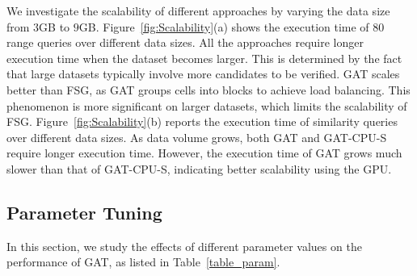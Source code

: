 \documentclass[10pt,conference,letterpaper]{IEEEtran}
\newcommand{\frname}{GAT\xspace }
\newcommand{\idxname}{GTIDX\xspace }
\begin{document}
We investigate the scalability of different approaches by varying the data size from $3$GB to $9$GB.
Figure~\ref{fig:Scalability}(a) shows the execution time of 80 range queries over different data sizes. All the approaches require longer execution time when the dataset becomes larger. This is determined by the fact that large datasets typically involve more candidates to be verified.
\frname scales better than FSG, as \frname groups cells into blocks to achieve load balancing. 
This phenomenon is more significant on larger datasets, which limits the scalability of FSG.
%
%
Figure~\ref{fig:Scalability}(b) reports the execution time of similarity queries over different data sizes. As data volume grows, both \frname and \frname-CPU-S require longer execution time. However, the execution time of \frname grows much slower than that of \frname-CPU-S, indicating better scalability using the GPU.


\subsection{Parameter Tuning}

In this section, we study the effects of different parameter values on the performance of \frname, as listed in Table~\ref{table_param}.
\end{document}
